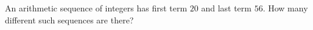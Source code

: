 An arithmetic sequence of integers has first term $20$ and last term $56$. How many different such sequences are there?
